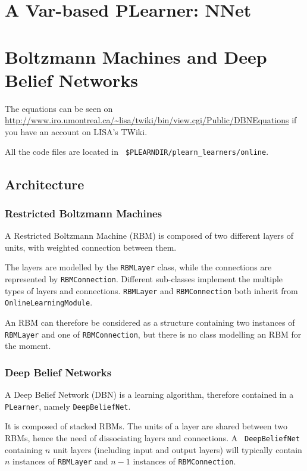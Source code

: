 \documentclass[11pt]{book}
\begin{document}
\chapter{A Var-based PLearner: NNet}

\chapter{Boltzmann Machines and Deep Belief Networks}

The equations can be seen on
\url{http://www.iro.umontreal.ca/~lisa/twiki/bin/view.cgi/Public/DBNEquations}
if you have an account on LISA's TWiki.

All the code files are located in {\tt
\$PLEARNDIR/plearn\_learners/online}.

\section{Architecture}

\subsection{Restricted Boltzmann Machines}

A Restricted Boltzmann Machine (RBM) is composed of two different layers
of units, with weighted connection between them.

The layers are modelled by the {\tt RBMLayer} class, while the
connections are represented by {\tt RBMConnection}. Different
sub-classes implement the multiple types of layers and connections.
{\tt RBMLayer} and {\tt RBMConnection} both inherit from {\tt
OnlineLearningModule}.

An RBM can therefore be considered as a structure containing two
instances of {\tt RBMLayer} and one of {\tt RBMConnection}, but there is
no class modelling an RBM for the moment.

\subsection{Deep Belief Networks}

A Deep Belief Network (DBN) is a learning algorithm, therefore contained
in a {\tt PLearner}, namely {\tt DeepBeliefNet}.

It is composed of stacked RBMs. The units of a layer are shared between
two RBMs, hence the need of dissociating layers and connections. A {\tt
DeepBeliefNet} containing $n$ unit layers (including input and output
layers) will typically contain $n$ instances of {\tt RBMLayer} and $n-1$
instances of {\tt RBMConnection}.
\end{document}
